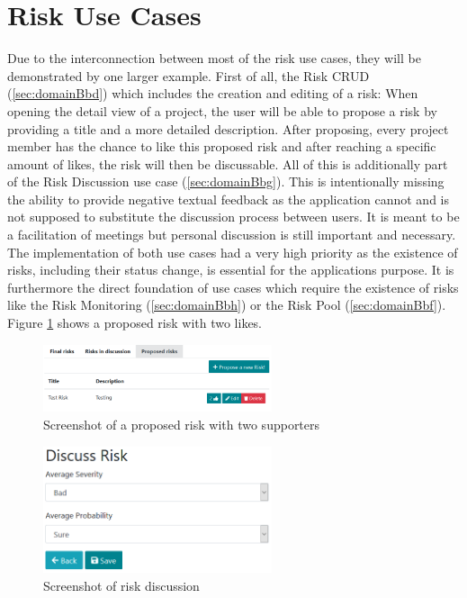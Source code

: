 
\section{Risk Use Cases}
\label{sec:implementationRisks}

Due to the interconnection between most of the risk use cases, they will be demonstrated by one larger example. First of all, the Risk CRUD (\ref{sec:domainBbd}) which includes the creation and editing of a risk: When opening the detail view of a project, the user will be able to propose a risk by providing a title and a more detailed description. After proposing, every project member has the chance to like this proposed risk and after reaching a specific amount of likes, the risk will then be discussable. All of this is additionally part of the Risk Discussion use case (\ref{sec:domainBbg}). This is intentionally missing the ability to provide negative textual feedback as the application cannot and is not supposed to substitute the discussion process between users. It is meant to be a facilitation of meetings but personal discussion is still important and necessary. The implementation of both use cases had a very high priority as the existence of risks, including their status change, is essential for the applications purpose. It is furthermore the direct foundation of use cases which require the existence of risks like the Risk Monitoring (\ref{sec:domainBbh}) or the Risk Pool (\ref{sec:domainBbf}). Figure \ref{fig:proposedrisk} shows a proposed risk with two likes.

\begin{figure}[H]
	\centering
	\includegraphics[width=0.6\textwidth]{Assets/implementation_shots/proposed_risk.png}
	\caption{Screenshot of a proposed risk with two supporters}
	\label{fig:proposedrisk}
\end{figure}

\begin{figure}[H]
	\centering
	\includegraphics[width=0.6\textwidth]{Assets/implementation_shots/riskdiscussion.png}
	\caption{Screenshot of risk discussion}
	\label{fig:riskdiscussion}
\end{figure}

